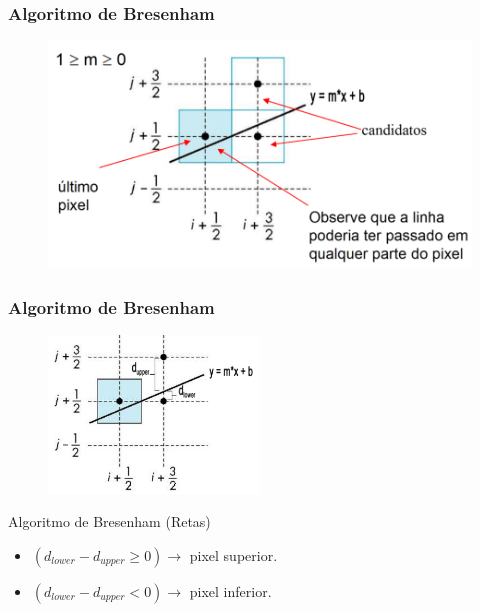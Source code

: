 \documentclass{beamer}
\begin{document}
\begin{frame}
\frametitle{Algoritmo de Bresenham}

		\begin{figure}[!h]
			\begin{center}
			\includegraphics[width=1\textwidth]{Figures/Bre}
			\end{center}
		\end{figure}
\end{frame}

\begin{frame}
\frametitle{Algoritmo de Bresenham}

		\begin{figure}[!h]
			\begin{center}
			\includegraphics[width=0.5\textwidth]{Figures/Bre1}
			\end{center}
		\end{figure}
		\begin{block}{Algoritmo de Bresenham (Retas)}
		\begin{itemize}
			\item$ (d_{lower} - d_{upper} \geq 0) \to$ pixel superior.
			\item$ (d_{lower} - d_{upper} < 0) \to$ pixel inferior.
		\end{itemize}
	\end{block}
\end{frame}
\end{document}
